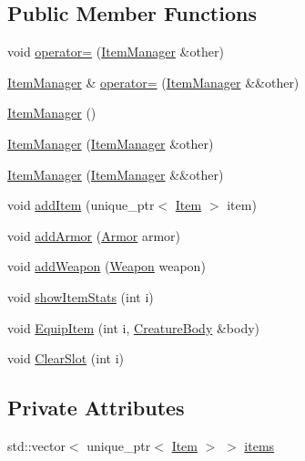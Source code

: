 \subsection*{Public Member Functions}
\begin{DoxyCompactItemize}
\item 
void \mbox{\hyperlink{class_item_manager_a2fc75a7db020109a6a11d6db7e56a791}{operator=}} (\mbox{\hyperlink{class_item_manager}{Item\+Manager}} \&other)
\item 
\mbox{\hyperlink{class_item_manager}{Item\+Manager}} \& \mbox{\hyperlink{class_item_manager_abc96dcbccd0ed64290ea3c5297f87646}{operator=}} (\mbox{\hyperlink{class_item_manager}{Item\+Manager}} \&\&other)
\item 
\mbox{\hyperlink{class_item_manager_a1eab68c1b49e695ba96330da469b23cc}{Item\+Manager}} ()
\item 
\mbox{\hyperlink{class_item_manager_ac6399b407125cb2e7bb0733dca40c23c}{Item\+Manager}} (\mbox{\hyperlink{class_item_manager}{Item\+Manager}} \&other)
\item 
\mbox{\hyperlink{class_item_manager_a83c334430c14d31046389a6044f33511}{Item\+Manager}} (\mbox{\hyperlink{class_item_manager}{Item\+Manager}} \&\&other)
\item 
void \mbox{\hyperlink{class_item_manager_af86e2b751da18d6d142c29f8c4860323}{add\+Item}} (unique\+\_\+ptr$<$ \mbox{\hyperlink{class_item}{Item}} $>$ item)
\item 
void \mbox{\hyperlink{class_item_manager_af16502a871d116ebd2241cd8d2d745f5}{add\+Armor}} (\mbox{\hyperlink{class_armor}{Armor}} armor)
\item 
void \mbox{\hyperlink{class_item_manager_a2631fb34c48555098029e18e66d7eb05}{add\+Weapon}} (\mbox{\hyperlink{class_weapon}{Weapon}} weapon)
\item 
void \mbox{\hyperlink{class_item_manager_a865c3d2863ca55df09728514e4f6cd6d}{show\+Item\+Stats}} (int i)
\item 
void \mbox{\hyperlink{class_item_manager_a55d0009a402e2f5fc3a18cf0629cec64}{Equip\+Item}} (int i, \mbox{\hyperlink{class_creature_body}{Creature\+Body}} \&body)
\item 
void \mbox{\hyperlink{class_item_manager_a2aa35a782e14a35ad9477c512e256303}{Clear\+Slot}} (int i)
\end{DoxyCompactItemize}
\subsection*{Private Attributes}
\begin{DoxyCompactItemize}
\item 
std\+::vector$<$ unique\+\_\+ptr$<$ \mbox{\hyperlink{class_item}{Item}} $>$ $>$ \mbox{\hyperlink{class_item_manager_a67bf78a9baf31874b6cd6309e0d86e1e}{items}}
\end{DoxyCompactItemize}


